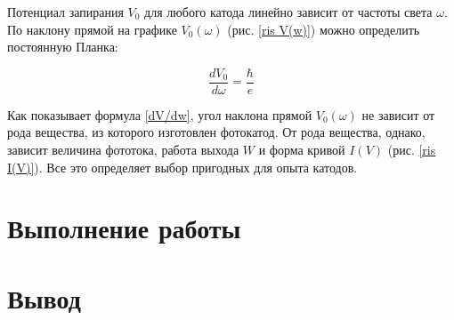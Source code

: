 \documentclass[12pt]{kiarticle}
\begin{document}
	Потенциал запирания $ V_0 $ для любого катода линейно зависит от
	частоты света $ \omega $. По наклону прямой на графике $ V_0(\omega) $ (рис. \ref{ris V(w)}) можно определить постоянную Планка:
	
	\begin{equation}\label{dV/dw}
	\dfrac{dV_0}{d\omega} = \dfrac{\hbar}{e}
	\end{equation}
	
	Как показывает формула \eqref{dV/dw}, угол наклона прямой $ V_0(\omega) $ не зависит от рода вещества, из которого изготовлен фотокатод. От рода вещества, однако, зависит величина фототока, работа выхода $ W $ и форма кривой $ I(V) $ (рис. \ref{ris I(V)}). Все это определяет выбор пригодных для
	опыта катодов.


	
	
	\section{Выполнение работы}
	
	
	
	
	\section{Вывод }
	
\end{document}
